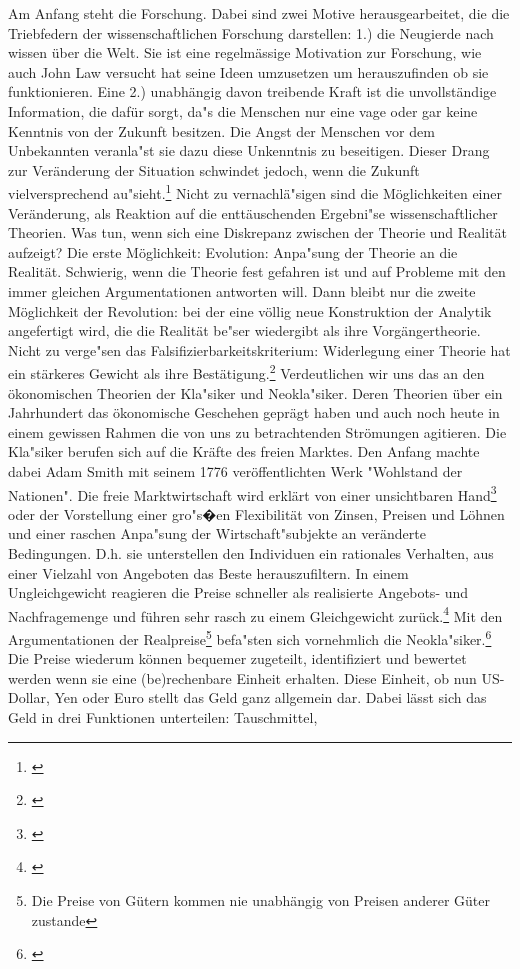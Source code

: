 \documentclass[
        onecolumn,
        a4paper,
        abstracton,
        parskip=half
        ,final
        ]{scrartcl}
\begin{document}

Am Anfang steht die Forschung. Dabei sind zwei Motive herausgearbeitet, die die Triebfedern der wissenschaftlichen Forschung darstellen:
1.) die Neugierde nach wissen {\"u}ber die Welt. Sie ist eine regelm{\"a}ssige Motivation zur Forschung, wie auch John Law versucht hat seine Ideen umzusetzen um herauszufinden ob sie funktionieren.
Eine 2.) unabh{\"a}ngig davon treibende Kraft ist die unvollst{\"a}ndige Information, die daf{\"u}r sorgt, da{"s} die Menschen nur eine vage oder gar keine Kenntnis von der Zukunft besitzen. Die Angst der Menschen vor dem Unbekannten veranla{"s}t sie dazu diese Unkenntnis zu beseitigen. Dieser Drang zur Ver{\"a}nderung der Situation schwindet jedoch, wenn die Zukunft vielversprechend au{"s}ieht.\footnote[101]{ \citep[S.11]{bombach1981theorie}} Nicht zu vernachl{\"a}{"s}igen sind die M{\"o}glichkeiten einer Ver{\"a}nderung, als Reaktion auf die entt{\"a}uschenden Ergebni{"s}e wissenschaftlicher Theorien. Was tun, wenn sich eine Diskrepanz zwischen der Theorie und Realit{\"a}t aufzeigt? Die erste M{\"o}glichkeit: Evolution: Anpa{"s}ung der Theorie an die Realit{\"a}t. Schwierig, wenn die Theorie fest gefahren ist und auf Probleme mit den immer gleichen Argumentationen antworten will. Dann bleibt nur die zweite M{\"o}glichkeit der Revolution: bei der eine v{\"o}llig neue Konstruktion der Analytik angefertigt wird, die die Realit{\"a}t be{"s}er wiedergibt als ihre Vorg{\"a}ngertheorie. Nicht zu verge{"s}en das Falsifizierbarkeitskriterium: Widerlegung einer Theorie hat ein st{\"a}rkeres Gewicht als ihre Best{\"a}tigung.\footnote[102]{\citep[S.161]{bombach1981theorie}} Verdeutlichen wir uns das an den {\"o}konomischen Theorien der Kla{"s}iker und Neokla{"s}iker. Deren Theorien {\"u}ber ein Jahrhundert das {\"o}konomische Geschehen gepr{\"a}gt haben und auch noch heute in einem gewissen Rahmen die von uns zu betrachtenden Str{\"o}mungen agitieren. Die Kla{"s}iker berufen sich auf die Kr{\"a}fte des freien Marktes. Den Anfang machte dabei Adam Smith mit seinem 1776 ver{\"o}ffentlichten Werk "Wohlstand der Nationen". Die freie Marktwirtschaft wird erkl{\"a}rt von einer unsichtbaren Hand\footnote[103]{\citep[S.137]{bombach1981theorie}} oder der Vorstellung einer gro{"s}�en Flexibilit{\"a}t von Zinsen, Preisen und L{\"o}hnen und einer raschen Anpa{"s}ung der Wirtschaft{"s}ubjekte an ver{\"a}nderte Bedingungen. D.h. sie unterstellen den Individuen ein rationales Verhalten, aus einer Vielzahl von Angeboten das Beste herauszufiltern. In einem Ungleichgewicht reagieren die Preise schneller als realisierte Angebots- und Nachfragemenge und f{\"u}hren sehr rasch zu einem Gleichgewicht zur{\"u}ck.\footnote[104]{\citep[S.291]{Basseler2010}} Mit den Argumentationen der Realpreise\footnote[105]{Die Preise von G{\"u}tern kommen nie unabh{\"a}ngig von Preisen anderer G{\"u}ter zustande} befa{"s}ten sich vornehmlich die Neokla{"s}iker.\footnote[106]{\citep[S.138]{bombach1981theorie}} Die Preise wiederum k{\"o}nnen bequemer zugeteilt, identifiziert und bewertet werden wenn sie eine (be)rechenbare Einheit erhalten. Diese Einheit, ob nun US-Dollar, Yen oder Euro stellt das Geld ganz allgemein dar. Dabei l{\"a}sst sich das Geld in drei Funktionen unterteilen: Tauschmittel, 
\end{document}
